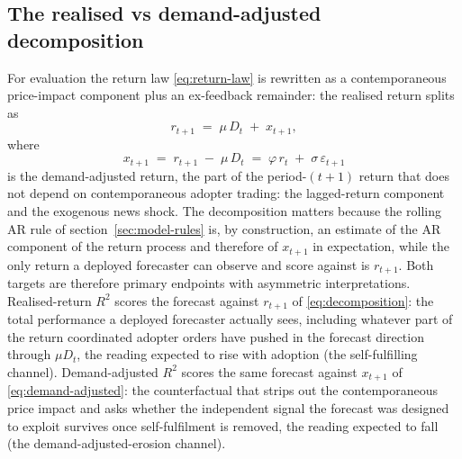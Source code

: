 \documentclass[12pt]{article}
\begin{document}
\subsection{The realised vs demand-adjusted decomposition}\label{sec:model-decomposition}

For evaluation the return law \eqref{eq:return-law} is rewritten as a contemporaneous price-impact component plus an ex-feedback remainder: the realised return splits as %
\begin{equation}
  r_{t+1} \;=\; \mu\, D_t \;+\; x_{t+1},
  \label{eq:decomposition}
\end{equation}
where
\begin{equation}
  x_{t+1} \;=\; r_{t+1} \;-\; \mu\, D_t \;=\; \varphi\, r_t \;+\; \sigma\, \varepsilon_{t+1}
  \label{eq:demand-adjusted}
\end{equation}
is the demand-adjusted return, the part of the period-$(t+1)$ return that does not depend on contemporaneous adopter trading: the lagged-return component and the exogenous news shock. %
The decomposition matters because the rolling AR rule of section~\ref{sec:model-rules} is, by construction, an estimate of the AR component of the return process and therefore of $x_{t+1}$ in expectation, while the only return a deployed forecaster can observe and score against is $r_{t+1}$. Both targets are therefore primary endpoints with asymmetric interpretations. Realised-return $R^{2}$ scores the forecast against $r_{t+1}$ of \eqref{eq:decomposition}: the total performance a deployed forecaster actually sees, including whatever part of the return coordinated adopter orders have pushed in the forecast direction through $\mu D_t$, the reading expected to rise with adoption (the self-fulfilling channel). Demand-adjusted $R^{2}$ scores the same forecast against $x_{t+1}$ of \eqref{eq:demand-adjusted}: the counterfactual that strips out the contemporaneous price impact and asks whether the independent signal the forecast was designed to exploit survives once self-fulfilment is removed, the reading expected to fall (the demand-adjusted-erosion channel). %
\end{document}
